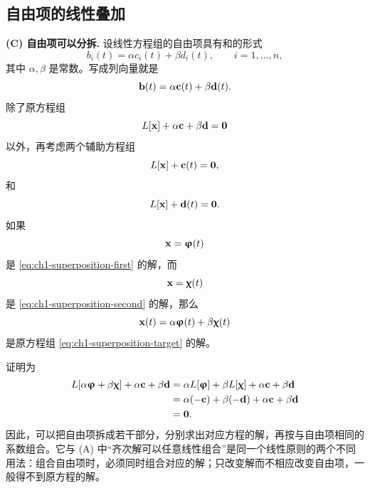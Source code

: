 \subsection{自由项的线性叠加}

\textbf{(C) 自由项可以分拆.} 设线性方程组的自由项具有和的形式
\begin{equation}
 b_i(t)=\alpha c_i(t)+\beta d_i(t),
 \qquad i=1,\ldots,n,
 \label{eq:ch1-forcing-decomposition}
\end{equation}
其中 \(\alpha,\beta\) 是常数。写成列向量就是
\[
 \vect{b}(t)=\alpha \vect{c}(t)+\beta \vect{d}(t).
\]
除了原方程组
\begin{equation}
 L[\vect{x}]+\alpha \vect{c}+\beta \vect{d}=\vect{0}
 \label{eq:ch1-superposition-target}
\end{equation}
以外，再考虑两个辅助方程组
\begin{equation}
 L[\vect{x}]+\vect{c}(t)=\vect{0},
 \label{eq:ch1-superposition-first}
\end{equation}
和
\begin{equation}
 L[\vect{x}]+\vect{d}(t)=\vect{0}.
 \label{eq:ch1-superposition-second}
\end{equation}
如果
\begin{equation}
 \vect{x}=\vect{\varphi}(t)
 \label{eq:ch1-superposition-first-solution}
\end{equation}
是 \eqref{eq:ch1-superposition-first} 的解，而
\begin{equation}
 \vect{x}=\vect{\chi}(t)
 \label{eq:ch1-superposition-second-solution}
\end{equation}
是 \eqref{eq:ch1-superposition-second} 的解，那么
\begin{equation}
 \vect{x}(t)=\alpha\vect{\varphi}(t)+\beta\vect{\chi}(t)
 \label{eq:ch1-superposition-combination}
\end{equation}
是原方程组 \eqref{eq:ch1-superposition-target} 的解。

证明为
\[
 \begin{aligned}
 L[\alpha\vect{\varphi}+\beta\vect{\chi}]+\alpha \vect{c}+\beta \vect{d}
 &=\alpha L[\vect{\varphi}]+\beta L[\vect{\chi}]+\alpha \vect{c}+\beta \vect{d}\\
 &=\alpha(-\vect{c})+\beta(-\vect{d})+\alpha \vect{c}+\beta \vect{d}\\
 &=\vect{0}.
 \end{aligned}
\]
因此，可以把自由项拆成若干部分，分别求出对应方程的解，再按与自由项相同的系数组合。它与 (A) 中“齐次解可以任意线性组合”是同一个线性原则的两个不同用法：组合自由项时，必须同时组合对应的解；只改变解而不相应改变自由项，一般得不到原方程的解。

